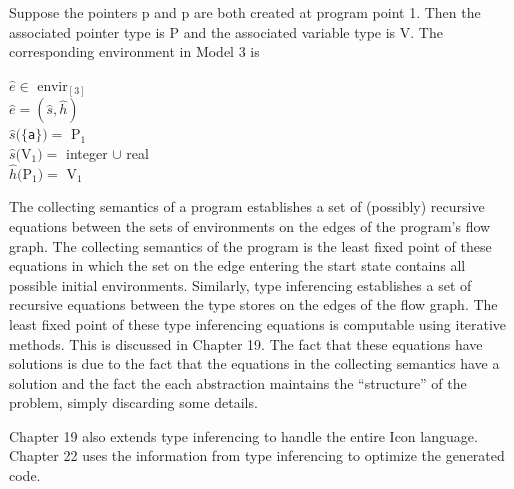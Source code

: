 Suppose the pointers p and p are
both created at program point 1. Then the associated pointer type is
P and the associated variable type is
V. The corresponding environment in Model 3 is

\goodbreak
\begin{specialcode}{}
\>$\hat{e} \in $ envir$_{[3]}$\\
\>$\hat{e} = (\hat{s},\hat{h})$\\

\>$\hat{s}(\{$\texttt{a}$\}) =  $ P$_1$\\
\>$\hat{s}($V$_1) = $ integer  $\cup$ real\\

\>$\hat{h}($P$_1) = $ V$_1$\\
\end{specialcode}



The collecting semantics of a program establishes a set of (possibly)
recursive equations between the sets of environments on the edges of
the program's flow graph. The collecting semantics of the program is
the least fixed point of these equations in which the set on the edge
entering the start state contains all possible initial environments.
Similarly, type inferencing establishes a set of recursive equations
between the type stores on the edges of the flow graph. The least
fixed point of these type inferencing equations is computable using
iterative methods. This is discussed in Chapter 19. The fact that
these equations have solutions is due to the fact that the equations
in the collecting semantics have a solution and the fact the each
abstraction maintains the ``structure'' of the problem, simply
discarding some details.

Chapter 19 also extends type inferencing to handle the entire Icon
language. Chapter 22 uses the information from type inferencing to
optimize the generated code.

